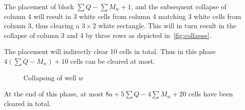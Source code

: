 The placement of block $\sum Q - \sum M_w + 1$, and the subsequent collapse of column 4 will result in 3 white cells from column 4 matching 3 white cells from column 3, thus clearing a $3 \times 2$ white rectangle. This will in turn result in the collapse of column 3 and 4 by three rows as depicted in~\autoref{fig:collapse}. 

The placement will indirectly clear 10 cells in total. Thus in this phase $4 \left( \sum Q - M_w \right) + 10$ cells can be cleared at most.

\begin{figure}[H]
    \centering
    \caption{Collapsing of well $w$}
    \label{fig:collapse}
\end{figure}

At the end of this phase, at most $8a + 5 \sum Q - 4 \sum M_w + 20$ cells have been cleared in total.
